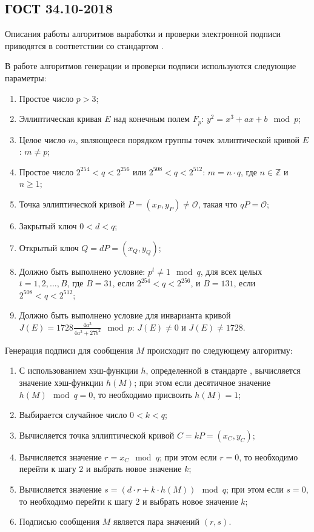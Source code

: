 \documentclass{./civarticle}
\begin{document}
\subsection{ГОСТ 34.10-2018}

Описания работы алгоритмов выработки и проверки электронной подписи приводятся в соответствии со стандартом \cite{gost10-2018}.

В работе алгоритмов генерации и проверки подписи используются следующие параметры:

\begin{enumerate}
    \item Простое число $p > 3$;
    \item Эллиптическая кривая $E$ над конечным полем $F_p$: $y^2 = x^3 + ax + b \mod p$;
    \item Целое число $m$, являющееся порядком группы точек эллиптической кривой $E$: $m \neq p$;
    \item Простое число $2^{254} < q < 2^{256}$ или $2^{508} < q < 2^{512}$: $m = n\cdot q$, где $n \in \mathbb{Z}$ и $n \geq 1$;
    \item Точка эллиптической кривой $P = (x_P, y_P) \neq \mathcal{O}$, такая что $qP = \mathcal{O}$;
    \item Закрытый ключ $0 < d < q$;
    \item Открытый ключ $Q = dP = (x_Q, y_Q)$;
    \item Должно быть выполнено условие: $p^t \neq 1 \mod q$, для всех целых $t = 1, 2, ..., B$, где $B = 31$, если $2^{254} < q < 2^{256}$, и $B = 131$, если $2^{508} < q < 2^{512}$;
    \item Должно быть выполнено условие для инварианта кривой $J(E) = 1728\frac{4a^3}{4a^3 + 27b^2} \mod p$: $J(E) \neq 0$ и $J(E) \neq 1728$.
\end{enumerate}

Генерация подписи для сообщения $M$ происходит по следующему алгоритму:

\begin{enumerate}
    \item С использованием хэш-функции $h$, определенной в стандарте \cite{gost11-2018}, вычисляется значение хэш-функции $h(M)$; при этом если десятичное значение $h(M) \mod q = 0$, то необходимо присвоить $h(M) = 1$;
    \item Выбирается случайное число $0 < k < q$;
    \item Вычисляется точка эллиптической кривой $C = kP = (x_C, y_C)$;
    \item Вычисляется значение $r = x_C \mod q$; при этом если $r = 0$, то необходимо перейти к шагу 2 и выбрать новое значение $k$;
    \item Вычисляется значение $s = (d\cdot r + k\cdot h(M)) \mod q$; при этом если $s = 0$, то необходимо перейти к шагу 2 и выбрать новое значение $k$;
    \item Подписью сообщения $M$ является пара значений $(r, s)$.
\end{enumerate}
\end{document}
